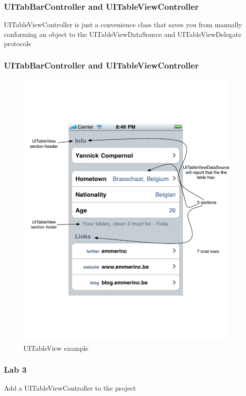 \documentclass[10pt]{beamer}
\begin{document}
\begin{frame}[fragile]
  \frametitle{UITabBarController and UITableViewController}
  UITableViewController is just a convenience class that saves you from manually conforming an object to the UITableViewDataSource and UITableViewDelegate protocols

\end{frame}

\begin{frame}[fragile]
  \frametitle{UITabBarController and UITableViewController}
  \begin{figure}[htb]
  \begin{center}

  \includegraphics[scale=0.3]{UIViewExample5.pdf}

  \caption{UITableView example}
  \end{center}
  \end{figure}

\end{frame}

    
\begin{frame}[fragile]
  \frametitle{Lab 3}
  Add a UITableViewController to the project

\end{frame}
\end{document}
